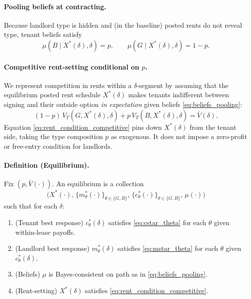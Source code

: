 \documentclass[11pt]{article}
\begin{document}
\paragraph{Pooling beliefs at contracting.}
Because landlord type is hidden and (in the baseline) posted rents do not reveal type, tenant beliefs satisfy
\begin{equation}
\mu(B\mid X^*(\delta),\delta)=p,\qquad \mu(G\mid X^*(\delta),\delta)=1-p.
\label{eq:beliefs_pooling}
\end{equation}

\paragraph{Competitive rent-setting conditional on $p$.}
We represent competition in rents within a $\delta$-segment by assuming that the equilibrium posted rent schedule $X^*(\delta)$ makes tenants indifferent between signing and their outside option \emph{in expectation} given beliefs \eqref{eq:beliefs_pooling}:
\begin{equation}
(1-p)\,V_T(G,X^*(\delta),\delta) + p\,V_T(B,X^*(\delta),\delta) = \bar V(\delta).
\label{eq:rent_condition_competitive}
\end{equation}
Equation \eqref{eq:rent_condition_competitive} pins down $X^*(\delta)$ from the tenant side, taking the type composition $p$ as exogenous. It does not impose a zero-profit or free-entry condition for landlords.

\paragraph{Definition (Equilibrium).}
Fix $(p,\bar V(\cdot))$. An equilibrium is a collection
\[
\Big(X^*(\cdot),\, \{m^*_\theta(\cdot)\}_{\theta\in\{G,B\}},\, \{c^*_\theta(\cdot)\}_{\theta\in\{G,B\}},\, \mu(\cdot)\Big)
\]
such that for each $\delta$:
\begin{enumerate}
  \item (Tenant best response) $c^*_\theta(\delta)$ satisfies \eqref{eq:cstar_theta} for each $\theta$ given within-lease payoffs.
  \item (Landlord best response) $m^*_\theta(\delta)$ satisfies \eqref{eq:mstar_theta} for each $\theta$ given $c^*_\theta(\delta)$.
  \item (Beliefs) $\mu$ is Bayes-consistent on path as in \eqref{eq:beliefs_pooling}.
  \item (Rent-setting) $X^*(\delta)$ satisfies \eqref{eq:rent_condition_competitive}.
\end{enumerate}
\end{document}
